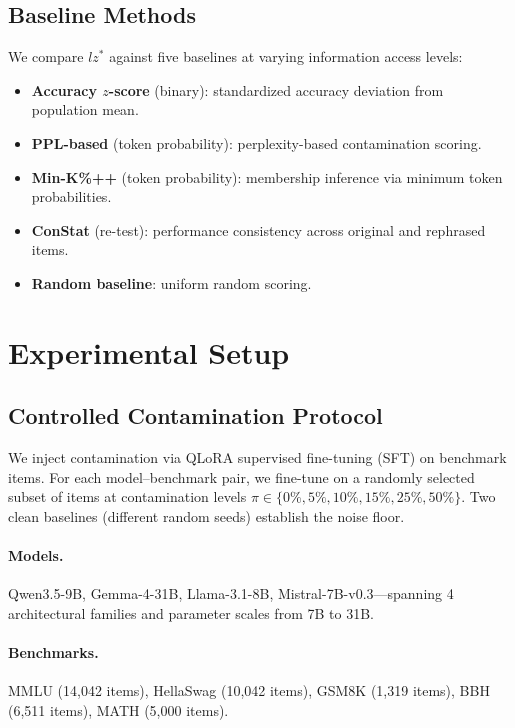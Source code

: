 \documentclass[11pt]{article}
\begin{document}
\subsection{Baseline Methods}

We compare $lz^*$ against five baselines at varying information access levels:
\begin{itemize}
    \item \textbf{Accuracy $z$-score} (binary): standardized accuracy deviation from population mean.
    \item \textbf{PPL-based} (token probability): perplexity-based contamination scoring.
    \item \textbf{Min-K\%++} \citep{shi2024detecting} (token probability): membership inference via minimum token probabilities.
    \item \textbf{ConStat} \citep{dekoninck2024constat} (re-test): performance consistency across original and rephrased items.
    \item \textbf{Random baseline}: uniform random scoring.
\end{itemize}

\section{Experimental Setup}
\label{sec:setup}

\subsection{Controlled Contamination Protocol}

We inject contamination via QLoRA supervised fine-tuning (SFT) on benchmark items.
For each model--benchmark pair, we fine-tune on a randomly selected subset of items at contamination levels $\pi \in \{0\%, 5\%, 10\%, 15\%, 25\%, 50\%\}$.
Two clean baselines (different random seeds) establish the noise floor.

\paragraph{Models.} Qwen3.5-9B, Gemma-4-31B, Llama-3.1-8B, Mistral-7B-v0.3---spanning 4 architectural families and parameter scales from 7B to 31B.

\paragraph{Benchmarks.} MMLU (14,042 items), HellaSwag (10,042 items), GSM8K (1,319 items), BBH (6,511 items), MATH (5,000 items).
\end{document}

